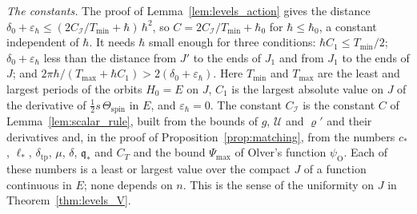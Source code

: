 \documentclass[aps,prd,onecolumn,tightenlines,nofootinbib,notitlepage,11pt,floatfix]{revtex4-2}
\theoremstyle{indentedtheorem}
\begin{document}
\emph{The constants.} The proof of Lemma~\ref{lem:levels_action} gives the distance $\delta_0+\varepsilon_\hbar\le(2C_\mathcal{I}/T_\text{min}+\hbar)\,\hbar^2$, so $C=2C_\mathcal{I}/T_\text{min}+\hbar_0$ for $\hbar\le\hbar_0$, a constant independent of $\hbar$. It needs $\hbar$ small enough for three conditions: $\hbar C_1\le T_\text{min}/2$; $\delta_0+\varepsilon_\hbar$ less than the distance from $J'$ to the ends of $J_1$ and from $J_1$ to the ends of $J$; and $2\pi\hbar/(T_\text{max}+\hbar C_1)>2(\delta_0+\varepsilon_\hbar)$. Here $T_\text{min}$ and $T_\text{max}$ are the least and largest periods of the orbits $H_0=E$ on $J$, $C_1$ is the largest absolute value on $J$ of the derivative of $\tfrac{1}{2}s\,\Theta_\text{spin}$ in $E$, and $\varepsilon_\hbar=0$. The constant $C_\mathcal{I}$ is the constant $C$ of Lemma~\ref{lem:scalar_rule}, built from the bounds of $g$, $\mathcal{U}$ and $\varrho'$ and their derivatives and, in the proof of Proposition~\ref{prop:matching}, from the numbers $c_*$, $\ell_*$, $\delta_\text{tp}$, $\mu$, $\delta$, $\mathfrak{q}_*$ and $C_T$ and the bound $\Psi_\text{max}$ of Olver's function $\psi_\text{O}$. Each of these numbers is a least or largest value over the compact $J$ of a function continuous in $E$; none depends on $n$. This is the sense of the uniformity on $J$ in Theorem~\ref{thm:levels_V}.
\end{document}
